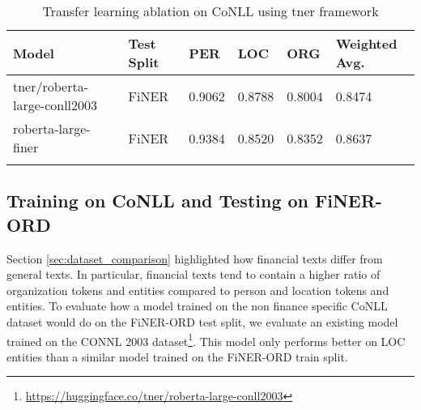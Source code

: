 \documentclass[11pt]{article}
\begin{document}
\begin{table*}[]
\centering
\footnotesize
\begin{tabular}{llllll}
\hline
\textbf{Model} & \textbf{Test Split}& \textbf{PER}& \textbf{LOC} & \textbf{ORG} & \textbf{Weighted Avg.}\\
\hline
tner/roberta-large-conll2003 & FiNER & 0.9062 & 0.8788 & 0.8004 & 0.8474\\
roberta-large-finer & FiNER & 0.9384 & 0.8520 & 0.8352 & 0.8637 \\
 \\
\hline
\end{tabular}
\caption{Transfer learning ablation on CoNLL using tner framework}
\label{tb:conll2003}
\end{table*}


\subsection{Training on CoNLL and Testing on FiNER-ORD}
\label{app:train_CoNLL}
Section \ref{sec:dataset_comparison} highlighted how financial texts differ from general texts. In particular, financial texts tend to contain a higher ratio of organization tokens and entities compared to person and location tokens and entities. To evaluate how a model trained on the non finance specific CoNLL dataset would do on the FiNER-ORD test split, we evaluate an existing model trained on the CONNL 2003 dataset\footnote{\url{https://huggingface.co/tner/roberta-large-conll2003}}. This model only performs better on LOC entities than a similar model trained on the FiNER-ORD train split. 
\end{document}
